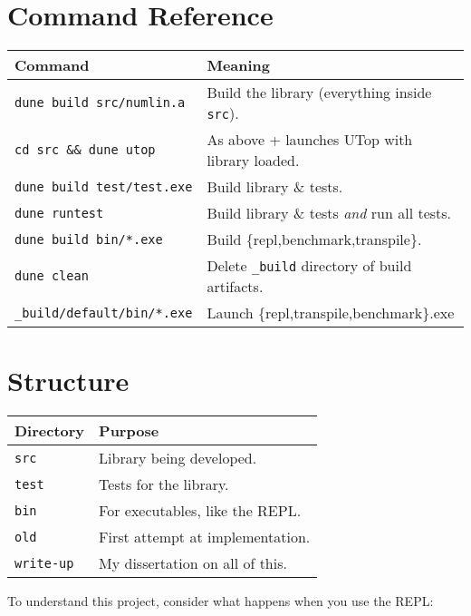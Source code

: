 \documentclass[a4paper,UKenglish]{lipics-v2019}
\begin{document}
\hypertarget{command-reference}{%
\section{Command Reference}\label{command-reference}}

\begin{longtable}[]{@{}ll@{}}
\toprule
Command & Meaning\tabularnewline
\midrule
\endhead
\texttt{dune\ build\ src/numlin.a} & Build the library (everything
inside \texttt{src}).\tabularnewline
\texttt{cd\ src\ \&\&\ dune\ utop} & As above + launches UTop with
library loaded.\tabularnewline
\texttt{dune\ build\ test/test.exe} & Build library \&
tests.\tabularnewline
\texttt{dune\ runtest} & Build library \& tests \emph{and} run all
tests.\tabularnewline
\texttt{dune\ build\ bin/*.exe} & Build
\{repl,benchmark,transpile\}.\tabularnewline
\texttt{dune\ clean} & Delete \texttt{\_build} directory of build
artifacts.\tabularnewline
\texttt{\_build/default/bin/*.exe} & Launch
\{repl,transpile,benchmark\}.exe\tabularnewline
\bottomrule
\end{longtable}

\hypertarget{structure}{%
\section{Structure}\label{structure}}

\begin{longtable}[]{@{}ll@{}}
\toprule
Directory & Purpose\tabularnewline
\midrule
\endhead
\texttt{src} & Library being developed.\tabularnewline
\texttt{test} & Tests for the library.\tabularnewline
\texttt{bin} & For executables, like the REPL.\tabularnewline
\texttt{old} & First attempt at implementation.\tabularnewline
\texttt{write-up} & My dissertation on all of this.\tabularnewline
\bottomrule
\end{longtable}

To understand this project, consider what happens when you use the REPL:
\end{document}
